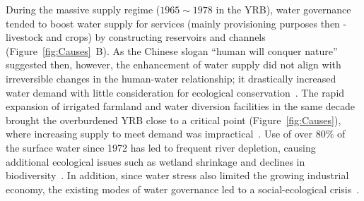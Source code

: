 \documentclass[draft]{../agujournal2019}
\begin{document}
During the massive supply regime ($1965 \sim 1978$ in the YRB), water governance tended to boost water supply for services (mainly provisioning purposes then -livestock and crops) by constructing reservoirs and channels (Figure~\ref{fig:Causes}~B).
As the Chinese slogan ``human will conquer nature'' suggested then, however, the enhancement of water supply did not align with irreversible changes in the human-water relationship; it drastically increased water demand with little consideration for ecological conservation~\cite{zhou2020}.
The rapid expansion of irrigated farmland and water diversion facilities in the same decade brought the overburdened YRB close to a critical point (Figure~\ref{fig:Causes}), where increasing supply to meet demand was impractical~\cite{loch2020}.
Use of over $80\%$ of the surface water since 1972 has led to frequent river depletion, causing additional ecological issues such as wetland shrinkage and declines in biodiversity~\cite{wang2019c}.
In addition, since water stress also limited the growing industrial economy, the existing modes of water governance led to a social-ecological crisis~\cite{wohlfart2016}.
\end{document}
